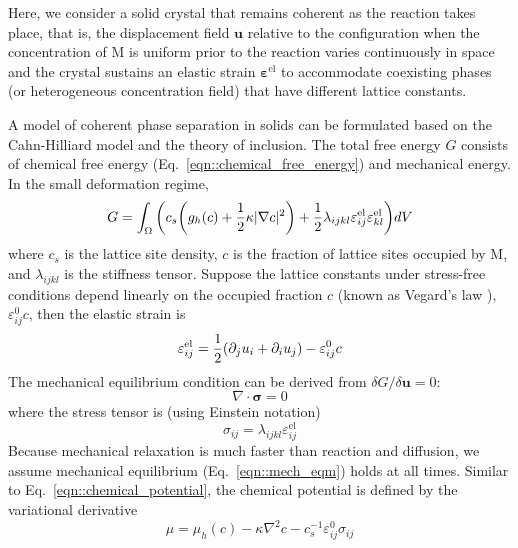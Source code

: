 \documentclass[reprint,aps,pre,superscriptaddress]{revtex4-2}
\let\originalleft\left
\let\originalright\right
\renewcommand{\left}{\mathopen{}\mathclose\bgroup\originalleft}
\renewcommand{\right}{\aftergroup\egroup\originalright}
\begin{document}
Here, we consider a solid crystal that remains coherent as the reaction takes place, that is, the displacement field $\mathbf{u}$ relative to the configuration when the concentration of M is uniform prior to the reaction varies continuously in space and the crystal sustains an elastic strain $\boldsymbol\varepsilon^{\text{el}}$ to accommodate coexisting phases (or heterogeneous concentration field) that have different lattice constants.

A model of coherent phase separation in solids can be formulated based on the Cahn-Hilliard model and the theory of inclusion\cite{khachaturyan2013theory,Cahn1984}. The total free energy $G$ consists of chemical free energy (Eq.~\ref{eqn::chemical_free_energy}) and mechanical energy. In the small deformation regime,
\begin{equation} \label{eqn::bulk_free_energy}
  G=\int_\Omega {\left( c_s \left( g_h(c) + \frac{1}{2} \kappa | \nabla c|^2  \right) + \frac{1}{2} \lambda_{ijkl} \varepsilon_{ij}^{\text{el}} \varepsilon_{kl}^{\text{el}} \right) dV }
\end{equation}
where $c_s$ is the lattice site density, $c$ is the fraction of lattice sites occupied by M, and  $\lambda_{ijkl}$ is the stiffness tensor.
Suppose the lattice constants under stress-free conditions depend linearly on the occupied fraction $c$ (known as Vegard's law \cite{Ashcroft1991}), $\varepsilon_{ij}^0 c$, then the elastic strain is
\begin{equation}
  \varepsilon_{ij}^{\text{el}} = \frac{1}{2} \left( \partial_j u_i + \partial_i u_j \right) - \varepsilon_{ij}^0 c
\end{equation}
The mechanical equilibrium condition can be derived from $\delta G / \delta \mathbf{u}=0$:
\begin{equation} \label{eqn::mech_eqm}
\nabla \cdot \bm{\sigma} = 0
\end{equation}
where the stress tensor is (using Einstein notation)
\begin{equation} \label{eqn::stress}
\sigma_{ij} = \lambda_{ijkl}\varepsilon_{ij}^{\text{el}}
\end{equation}
Because mechanical relaxation is much faster than reaction and diffusion, we assume mechanical equilibrium (Eq.~\ref{eqn::mech_eqm}) holds at all times.
Similar to Eq.~\ref{eqn::chemical_potential}, the chemical potential is defined by the variational derivative
\begin{equation} \label{eqn::mu}
  \mu = \mu_h(c) - \kappa \nabla^2 c - c_s^{-1} \varepsilon_{ij}^0 \sigma_{ij}
\end{equation}
\end{document}
